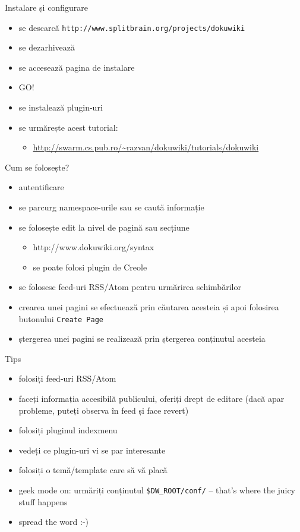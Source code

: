 \documentclass{beamer}
\begin{document}
\begin{frame}{Instalare și configurare}
  \begin{itemize}
    \item se descarcă \texttt{http://www.splitbrain.org/projects/dokuwiki}
    \item se dezarhivează
    \item se accesează pagina de instalare
    \item GO!
    \item se instalează plugin-uri
    \item se urmărește acest tutorial:
      \begin{itemize}
        \item \url{http://swarm.cs.pub.ro/~razvan/dokuwiki/tutorials/dokuwiki}
      \end{itemize}
  \end{itemize}
\end{frame}

\begin{frame}{Cum se folosește?}
  \begin{itemize}
    \item autentificare
    \item se parcurg namespace-urile sau se caută informație
    \item se folosește edit la nivel de pagină sau secțiune
      \begin{itemize}
        \item http://www.dokuwiki.org/syntax
        \item se poate folosi plugin de Creole
      \end{itemize}
    \item se folosesc feed-uri RSS/Atom pentru urmărirea schimbărilor
    \item crearea unei pagini se efectuează prin căutarea acesteia și apoi
    folosirea butonului \texttt{Create Page}
    \item ștergerea unei pagini se realizează prin ștergerea conținutul
    acesteia
  \end{itemize}
\end{frame}

\begin{frame}{Tips}
  \begin{itemize}
    \item folosiți feed-uri RSS/Atom
    \item faceți informația accesibilă publicului, oferiți drept de editare
    (dacă apar probleme, puteți observa în feed și face revert)
    \item folosiți pluginul indexmenu
    \item vedeți ce plugin-uri vi se par interesante
    \item folosiți o temă/template care să vă placă
    \item geek mode on: urmăriți conținutul \texttt{\$DW\_ROOT/conf/} --
    that's where the juicy stuff happens
    \item spread the word :-)
  \end{itemize}
\end{frame}
\end{document}
